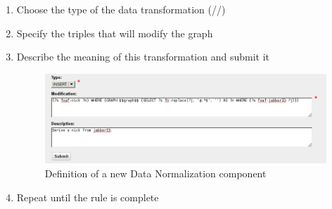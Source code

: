 \begin{enumerate}[resume]
\newpage

\vspace*{0.2\textheight}

	\item Choose the type of the data transformation (//)
	\item Specify the triples that will modify the graph
	\item Describe the meaning of this transformation and submit it

\begin{figure}[!ht]
    \centering
    \includegraphics[width=\textwidth]{images/fe-walkthrough-new-component.png}
    \caption{Definition of a new Data Normalization component}
	\label{fig:feWTNewComponent}
\end{figure}
\FloatBarrier

\vspace*{0.2\textheight}

	\item Repeat until the rule is complete
\end{enumerate}

\newpage  
